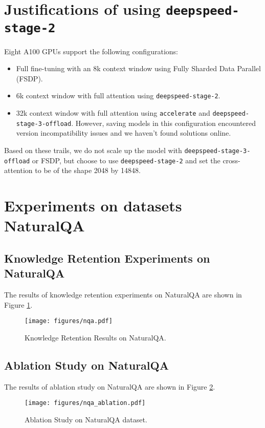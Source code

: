 \section{Justifications of using \texttt{deepspeed-stage-2}}
\label{sub:justifications_of_deepspeed_2}
Eight A100 GPUs support the following configurations:
\begin{itemize}
    \item Full fine-tuning with an 8k context window using Fully Sharded Data Parallel (FSDP). 
    \item 6k context window with full attention using \texttt{deepspeed-stage-2}.
    \item 32k context window with full attention using \texttt{accelerate} and \texttt{deepspeed-stage-3-offload}. However, saving models in this configuration encountered version incompatibility issues and we haven't found solutions online. 
\end{itemize}
Based on these trails, we do not scale up the model with \texttt{deepspeed-stage-3-offload} or FSDP, but choose to use \texttt{deepspeed-stage-2} and set the cross-attention to be of the shape 2048 by 14848. 

\section{Experiments on datasets NaturalQA}

\subsection{Knowledge Retention Experiments on NaturalQA}
\label{sub:knowledge_retention_nqa}
The results of knowledge retention experiments on NaturalQA are shown in Figure \ref{fig:knowledge-retention-nqa}. 

\begin{figure}[h!]
    \centering
    \texttt{[image: figures/nqa.pdf]}
    \caption{Knowledge Retention Results on NaturalQA.}
    \label{fig:knowledge-retention-nqa}
\end{figure}

\subsection{Ablation Study on NaturalQA}
\label{sub:ablation_study_naturalqa}
The results of ablation study on NaturalQA are shown in Figure \ref{fig:nqa_ablation}.

\begin{figure}[h!]
\centering
    \texttt{[image: figures/nqa\_ablation.pdf]}
    \caption{Ablation Study on NaturalQA dataset.}
    \label{fig:nqa_ablation}
\end{figure}

